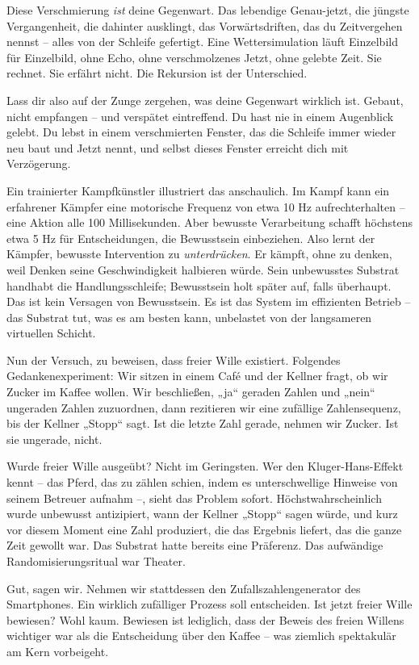 \documentclass[11pt, twoside, openright]{book}
\begin{document}
Diese Verschmierung \textit{ist} deine Gegenwart. Das lebendige Genau-jetzt, die jüngste Vergangenheit, die dahinter ausklingt, das Vorwärtsdriften, das du Zeitvergehen nennst -- alles von der Schleife gefertigt. Eine Wettersimulation läuft Einzelbild für Einzelbild, ohne Echo, ohne verschmolzenes Jetzt, ohne gelebte Zeit. Sie rechnet. Sie erfährt nicht. Die Rekursion ist der Unterschied.

Lass dir also auf der Zunge zergehen, was deine Gegenwart wirklich ist. Gebaut, nicht empfangen -- und verspätet eintreffend. Du hast nie in einem Augenblick gelebt. Du lebst in einem verschmierten Fenster, das die Schleife immer wieder neu baut und Jetzt nennt, und selbst dieses Fenster erreicht dich mit Verzögerung.

Ein trainierter Kampfkünstler illustriert das anschaulich. Im Kampf kann ein erfahrener Kämpfer eine motorische Frequenz von etwa 10 Hz aufrechterhalten -- eine Aktion alle 100 Millisekunden. Aber bewusste Verarbeitung schafft höchstens etwa 5 Hz für Entscheidungen, die Bewusstsein einbeziehen. Also lernt der Kämpfer, bewusste Intervention zu \textit{unterdrücken}. Er kämpft, ohne zu denken, weil Denken seine Geschwindigkeit halbieren würde. Sein unbewusstes Substrat handhabt die Handlungsschleife; Bewusstsein holt später auf, falls überhaupt. Das ist kein Versagen von Bewusstsein. Es ist das System im effizienten Betrieb -- das Substrat tut, was es am besten kann, unbelastet von der langsameren virtuellen Schicht.

Nun der Versuch, zu beweisen, dass freier Wille existiert. Folgendes Gedankenexperiment: Wir sitzen in einem Café und der Kellner fragt, ob wir Zucker im Kaffee wollen. Wir beschließen, „ja“ geraden Zahlen und „nein“ ungeraden Zahlen zuzuordnen, dann rezitieren wir eine zufällige Zahlensequenz, bis der Kellner „Stopp“ sagt. Ist die letzte Zahl gerade, nehmen wir Zucker. Ist sie ungerade, nicht.

Wurde freier Wille ausgeübt? Nicht im Geringsten. Wer den Kluger-Hans-Effekt kennt -- das Pferd, das zu zählen schien, indem es unterschwellige Hinweise von seinem Betreuer aufnahm --, sieht das Problem sofort. Höchstwahrscheinlich wurde unbewusst antizipiert, wann der Kellner „Stopp“ sagen würde, und kurz vor diesem Moment eine Zahl produziert, die das Ergebnis liefert, das die ganze Zeit gewollt war. Das Substrat hatte bereits eine Präferenz. Das aufwändige Randomisierungsritual war Theater.

Gut, sagen wir. Nehmen wir stattdessen den Zufallszahlengenerator des Smartphones. Ein wirklich zufälliger Prozess soll entscheiden. Ist jetzt freier Wille bewiesen? Wohl kaum. Bewiesen ist lediglich, dass der Beweis des freien Willens wichtiger war als die Entscheidung über den Kaffee -- was ziemlich spektakulär am Kern vorbeigeht.
\end{document}
